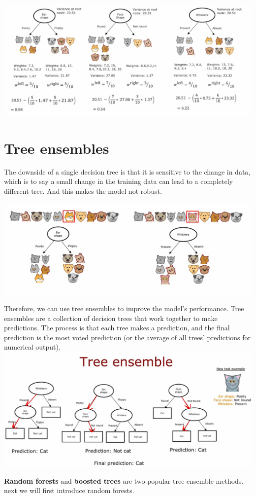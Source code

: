 \includegraphics*[width=\textwidth]{images/11.12}
\section{Tree ensembles}
The downside of a single decision tree is that it is sensitive to the change in data, 
which is to say a small change in the training data can lead to a completely different tree.
And this makes the model not robust.\par
\includegraphics*[width=\textwidth]{images/11.13}\par
Therefore, we can use tree ensembles to improve the model's performance.
Tree ensembles are a collection of decision trees that work together to make predictions.
The process is that each tree makes a prediction, 
and the final prediction is the most voted prediction 
(or the average of all trees' predictions for numerical output).\\
\includegraphics*[width=\textwidth]{images/11.14}
\par
\textbf{Random forests} and \textbf{boosted trees} are two popular tree ensemble methods.
next we will first introduce random forests.
